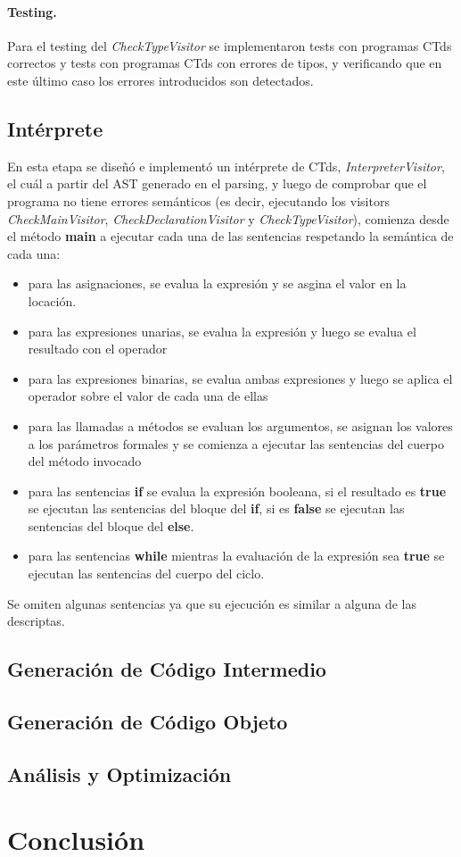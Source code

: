 \documentclass[11pt,a4paper]{article}
\begin{document}
\paragraph{Testing.} Para el testing del \textit{CheckTypeVisitor} se implementaron tests con programas CTds correctos y tests con programas CTds con errores de tipos, y verificando que en este último caso los errores introducidos son detectados.

\subsection{Intérprete} 
\label{subsec:interprete}

En esta etapa se diseñó e implementó un intérprete de CTds, \textit{InterpreterVisitor}, el cuál a partir del AST generado en el parsing, y luego de comprobar que el programa no tiene errores semánticos (es decir, ejecutando los visitors \textit{CheckMainVisitor}, \textit{CheckDeclarationVisitor} y \textit{CheckTypeVisitor}), comienza desde el método \textbf{main} a ejecutar cada una de las sentencias respetando la semántica de cada una:
\begin{itemize}
\item para las asignaciones, se evalua la expresión y se asgina el valor en la locación.
\item para las expresiones unarias, se evalua la expresión y luego se evalua el resultado con el operador
\item para las expresiones binarias, se evalua ambas expresiones y luego se aplica el operador sobre el valor de cada una de ellas
\item para las llamadas a métodos se evaluan los argumentos, se asignan los valores a los parámetros formales y se comienza a ejecutar las sentencias del cuerpo del método invocado
\item para las sentencias \textbf{if} se evalua la expresión booleana, si el resultado es \textbf{true} se ejecutan las sentencias del bloque del \textbf{if}, si es \textbf{false} se ejecutan las sentencias del bloque del \textbf{else}.
\item para las sentencias \textbf{while} mientras la evaluación de la expresión sea \textbf{true} se ejecutan las sentencias del cuerpo del ciclo.
\end{itemize}
Se omiten algunas sentencias ya que su ejecución es similar a alguna de las descriptas. 

\subsection{Generación de Código Intermedio} 
\label{subsec:genci}

\subsection{Generación de Código Objeto} 
\label{subsec:genco}

\subsection{Análisis y Optimización} 
\label{subsec:opt}

\section{Conclusión} 
\label{sec:concl}
\end{document}
